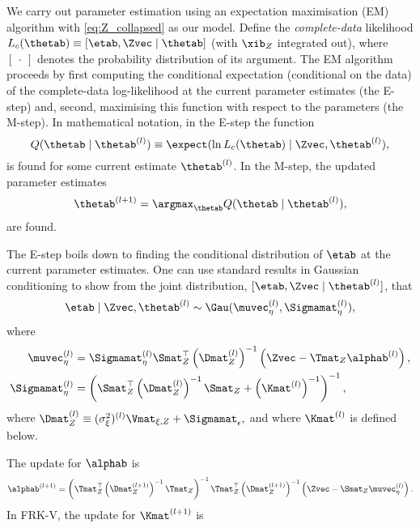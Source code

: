 We carry out parameter estimation using an expectation maximisation (EM) algorithm \citep[similar to][]{Katzfuss_2011,Nguyen_2014} with \eqref{eq:Z_collapsed} as our model. Define the \emph{complete-data} likelihood $L_c(\thetab) \equiv [\etab,\Zvec \mid \thetab]$ (with $\xib_Z$ integrated out), where $[~\cdot~]$ denotes the probability distribution of its argument.  The EM algorithm proceeds by first computing the conditional expectation (conditional on the data) of the complete-data log-likelihood at the current parameter estimates (the E-step) and, second, maximising this function with respect to the parameters (the M-step). In mathematical notation, in the E-step the function
\begin{equation*}
Q(\thetab \mid \thetab^{(l)}) \equiv \expect(\ln L_c(\thetab) \mid \Zvec,\thetab^{(l)}),
\end{equation*}
is found for some current estimate $\thetab^{(l)}$. In the M-step, the updated parameter estimates
\begin{equation*}
\thetab^{(l+1)} = \argmax_\thetab Q(\thetab \mid \thetab^{(l)}),
\end{equation*}
are found.

The E-step boils down to finding the conditional distribution of $\etab$ at the current parameter estimates. One can use standard results in Gaussian conditioning \citep[e.g., ][ Appendix A]{Rasmussen_2006}  to show from the joint distribution, $[\etab,\Zvec \mid \thetab^{(l)}]$, that
\begin{equation*}
\etab \mid \Zvec,\thetab^{(l)} \sim \Gau(\muvec_\eta^{(l)},\Sigmamat_\eta^{(l)}),
\end{equation*}
where
\begin{align*}
\muvec_\eta^{(l)} &= \Sigmamat_\eta^{(l)} \Smat_Z^\top\left(\Dmat_Z^{(l)}\right)^{-1}\left(\Zvec - \Tmat_Z\alphab^{(l)}\right), \\
\Sigmamat_\eta^{(l)} &= \left(\Smat_Z^\top\left(\Dmat_Z^{(l)}\right)^{-1}\Smat_Z + \left(\Kmat^{(l)}\right)^{-1}\right)^{-1},
\end{align*}
where $\Dmat_Z^{(l)} \equiv (\sigma^2_\xi)^{(l)} \Vmat_{\xi,Z} + \Sigmamat_\epsilon,$ and where $\Kmat^{(l)}$ is defined below.

The update for $\alphab$ is
\begin{equation}
\alphab^{(l+1)} = \left(\Tmat_Z^\top \left(\Dmat_Z^{(l+1)}\right)^{-1} \Tmat_Z\right)^{-1}\Tmat_Z^\top\left(\Dmat_Z^{(l+1)}\right)^{-1}\left(\Zvec - \Smat_Z \muvec_\eta^{(l)}\right). \label{eq:alpha}
\end{equation}
In FRK-V, the update for $\Kmat^{(l+1)}$ is


